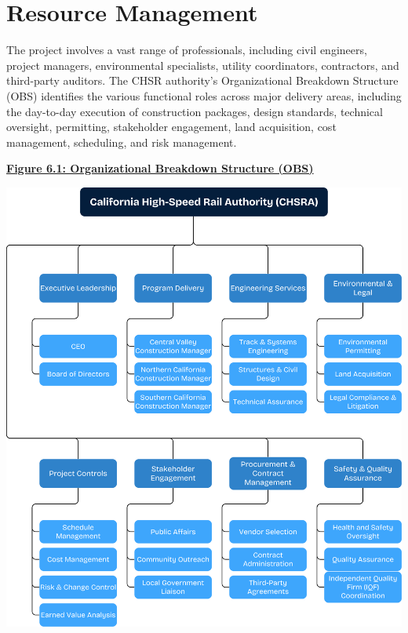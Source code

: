 \chapter{Resource Management}
The project involves a vast range of professionals, including civil engineers, project managers, environmental specialists, utility coordinators, contractors, and third-party auditors. The CHSR authority’s Organizational Breakdown Structure (OBS) identifies the various functional roles across major delivery areas, including the day-to-day execution of construction packages, design standards, technical oversight, permitting, stakeholder engagement, land acquisition, cost management, scheduling, and risk management.

\centering\textbf{\underline{Figure 6.1: Organizational Breakdown Structure (OBS)}} \par
\noindent 
\vspace*{1em}
\includegraphics[width=\linewidth]{./attachments/obs}
\justifying\par